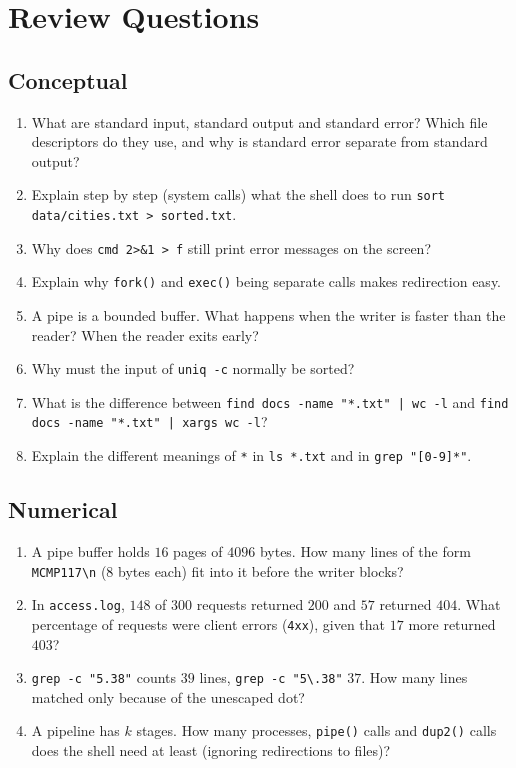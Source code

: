 \documentclass[11pt,a4paper]{article}
\newcommand{\cmd}[1]{\texttt{#1}}
\begin{document}
\section{Review Questions}

\subsection*{Conceptual}
\begin{enumerate}[leftmargin=1.6em]
  \item What are standard input, standard output and standard error? Which file descriptors do they use, and why is standard error separate from standard output?
  \item Explain step by step (system calls) what the shell does to run \cmd{sort data/cities.txt > sorted.txt}.
  \item Why does \cmd{cmd 2>\&1 > f} still print error messages on the screen?
  \item Explain why \cmd{fork()} and \cmd{exec()} being separate calls makes redirection easy.
  \item A pipe is a bounded buffer. What happens when the writer is faster than the reader? When the reader exits early?
  \item Why must the input of \cmd{uniq -c} normally be sorted?
  \item What is the difference between \cmd{find docs -name "*.txt" | wc -l} and \cmd{find docs -name "*.txt" | xargs wc -l}?
  \item Explain the different meanings of \texttt{*} in \cmd{ls *.txt} and in \cmd{grep "[0-9]*"}.
\end{enumerate}

\subsection*{Numerical}
\begin{enumerate}[leftmargin=1.6em,resume]
  \item A pipe buffer holds $16$ pages of $4096$ bytes. How many lines of the form \texttt{MCMP117\textbackslash n} ($8$ bytes each) fit into it before the writer blocks?
  \item In \texttt{access.log}, $148$ of $300$ requests returned $200$ and $57$ returned $404$. What percentage of requests were client errors (\texttt{4xx}), given that $17$ more returned $403$?
  \item \cmd{grep -c "5.38"} counts $39$ lines, \cmd{grep -c "5\textbackslash.38"} $37$. How many lines matched only because of the unescaped dot?
  \item A pipeline has $k$ stages. How many processes, \cmd{pipe()} calls and \cmd{dup2()} calls does the shell need at least (ignoring redirections to files)?
\end{enumerate}
\end{document}
